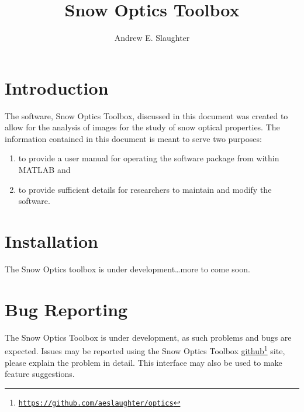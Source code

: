 \documentclass{article}
\title{Snow Optics Toolbox}
\author{Andrew E. Slaughter}
\begin{document}
\maketitle
\tableofcontents

\section{Introduction}
The software, Snow Optics Toolbox, discussed in this document was created to allow for the analysis of images for the study of snow optical properties. The information contained in this document is meant to serve two purposes:
\begin{enumerate}
\item to provide a user manual for operating the software package from within MATLAB and
\item to provide sufficient details for researchers to maintain and modify the software.
\end{enumerate}

\section{Installation}
The Snow Optics toolbox is under development\ldots more to come soon.

\section{Bug Reporting}
The Snow Optics Toolbox is under development, as such problems and bugs are expected. Issues may be reported using the Snow Optics Toolbox \href{https://github.com/aeslaughter/optics/issues}{github}\footnote{\href{https://github.com/aeslaughter/optics}{\nolinkurl{https://github.com/aeslaughter/optics}}} site, please explain the problem in detail. This interface may also be used to make feature suggestions.
\end{document}
